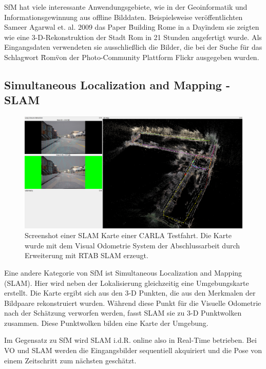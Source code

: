 SfM hat viele interessante Anwendungsgebiete, wie in der Geoinformatik und Informationsgewinnung aus offline Bilddaten. Beispielsweise veröffentlichten Sameer Agarwal et. al. 2009 das Paper \"Building Rome in a Day\" indem sie zeigten wie eine 3-D-Rekonstruktion der Stadt Rom in 21 Stunden angefertigt wurde. Als Eingangsdaten verwendeten sie ausschlie{\ss}lich die Bilder, die bei der Suche für das Schlagwort \"Rom\" von der Photo-Community Plattform Flickr ausgegeben wurden.\cite{RomeDay}

\subsection{Simultaneous Localization and Mapping - SLAM}
\begin{center}
  \begin{figure}[h!]
    \centering
    \includegraphics[width=\textwidth]{pictures/Screenshot from 2022-02-19 21-49-24.png}
    \caption[SLAM Map aus CARLA Testfahrt]{Screenshot einer SLAM Karte einer CARLA Testfahrt. Die Karte wurde mit dem Visual Odometrie System der Abschlussarbeit durch Erweiterung mit RTAB SLAM erzeugt.}
    \label{fig:rtabslam}
  \end{figure}
\end{center}
Eine andere Kategorie von SfM ist Simultaneous Localization and Mapping (SLAM). Hier wird neben der Lokalisierung gleichzeitig eine Umgebungskarte erstellt. Die Karte ergibt sich aus den 3-D Punkten, die aus den Merkmalen der Bildpaare rekonstruiert wurden. Während diese Punkt für die Visuelle Odometrie nach der Schätzung verworfen werden, fasst SLAM sie zu 3-D Punktwolken zusammen. Diese Punktwolken bilden eine Karte der Umgebung.
\newline

Im Gegensatz zu SfM wird SLAM i.d.R. online also in Real-Time betrieben. Bei VO und SLAM werden die Eingangsbilder sequentiell akquiriert und die Pose von einem Zeitschritt zum nächsten geschätzt.
\newline

